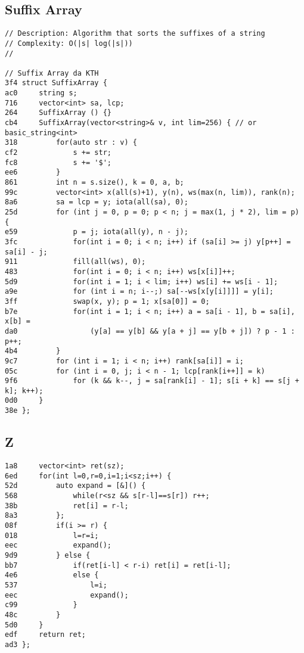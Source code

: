 \documentclass[11pt, a4paper, twoside]{article}
\begin{document}
\subsection{Suffix Array}
\begin{lstlisting}
// Description: Algorithm that sorts the suffixes of a string
// Complexity: O(|s| log(|s|))
//

// Suffix Array da KTH
3f4 struct SuffixArray {
ac0     string s;
716     vector<int> sa, lcp;
264     SuffixArray () {}
cb4     SuffixArray(vector<string>& v, int lim=256) { // or basic_string<int>
318         for(auto str : v) {
cf2             s += str;
fc8             s += '$';
ee6         }
861         int n = s.size(), k = 0, a, b;
99c         vector<int> x(all(s)+1), y(n), ws(max(n, lim)), rank(n);
8a6         sa = lcp = y; iota(all(sa), 0);
25d         for (int j = 0, p = 0; p < n; j = max(1, j * 2), lim = p) {
e59             p = j; iota(all(y), n - j);
3fc             for(int i = 0; i < n; i++) if (sa[i] >= j) y[p++] = sa[i] - j;
911             fill(all(ws), 0);
483             for(int i = 0; i < n; i++) ws[x[i]]++;
5d9             for(int i = 1; i < lim; i++) ws[i] += ws[i - 1];
a9e             for (int i = n; i--;) sa[--ws[x[y[i]]]] = y[i];
3ff             swap(x, y); p = 1; x[sa[0]] = 0;
b7e             for(int i = 1; i < n; i++) a = sa[i - 1], b = sa[i], x[b] =
da0                 (y[a] == y[b] && y[a + j] == y[b + j]) ? p - 1 : p++;
4b4         }
9c7         for (int i = 1; i < n; i++) rank[sa[i]] = i;
05c         for (int i = 0, j; i < n - 1; lcp[rank[i++]] = k)
9f6             for (k && k--, j = sa[rank[i] - 1]; s[i + k] == s[j + k]; k++);
0d0     }
38e };
\end{lstlisting}

\subsection{Z}
\begin{lstlisting}
1a8 	vector<int> ret(sz);
6ed 	for(int l=0,r=0,i=1;i<sz;i++) {
52d 		auto expand = [&]() {
568 			while(r<sz && s[r-l]==s[r]) r++;
38b 			ret[i] = r-l;
8a3 		};
08f 		if(i >= r) {
018 			l=r=i;
eec 			expand();
9d9 		} else {
bb7 			if(ret[i-l] < r-i) ret[i] = ret[i-l];
4e6 			else {
537 				l=i;
eec 				expand();
c99 			}
48c 		}
5d0 	}
edf 	return ret;
ad3 };
\end{lstlisting}



%
%
\end{document}
